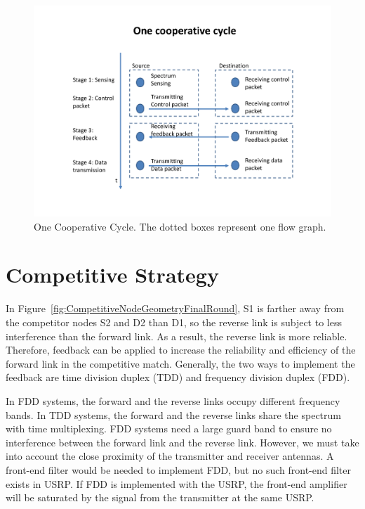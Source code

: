 \begin{figure}[tpb]
  \begin{center}
    \centerline{\includegraphics[width=160mm]{CooperativeCycle.pdf}}
    \caption{One Cooperative Cycle. The dotted boxes represent one flow graph.}
    \label{fig:CooperativeCycle}
  \end{center}
\end{figure}


\section{Competitive Strategy}
\label{comptititveStrategy}
In Figure~\ref{fig:CompetitiveNodeGeometryFinalRound}, S1 is farther away from the competitor nodes S2 and D2 than D1, so the reverse link is subject to less interference than the forward link. As a result, the reverse link is more reliable. Therefore, feedback can be applied to increase the reliability and efficiency of the forward link in the competitive match. Generally, the two ways to implement the feedback are time division duplex (TDD) and frequency division duplex (FDD).

In FDD systems, the forward and the reverse links occupy different frequency bands. In TDD systems, the forward and the reverse links share the spectrum with time multiplexing. FDD systems need a large guard band to ensure no interference between the forward link and the reverse link. However, we must take into account the close proximity of the transmitter and receiver antennas. A front-end filter would be needed to implement FDD, but no such front-end filter exists in USRP. If FDD is implemented with the USRP, the front-end amplifier will be saturated by the signal from the transmitter at the same USRP.

